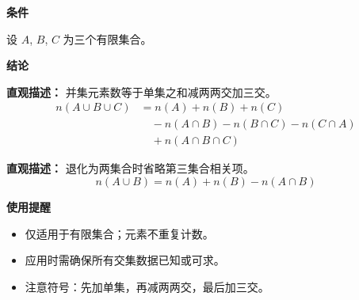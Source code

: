 \begin{statementbox}
	\textbf{\textcolor{CStatement}{条件}}
	\begin{description}[style=nextline, leftmargin=2.8em, labelsep=0.5em, itemsep=0.35em]
		\item[\textbf{\textcolor{CStatement}{条件 1（三有限集）：}}] 设 $A$, $B$, $C$ 为三个有限集合。
	\end{description}

	\textbf{\textcolor{CStatement}{结论}}
	\begin{description}[style=nextline, leftmargin=2.8em, labelsep=0.5em, itemsep=0.45em]
		\item[\textbf{\textcolor{CStatement}{结论一（并集计数）：}}]
			\textbf{\textcolor{CStatement}{直观描述：}}
			并集元素数等于单集之和减两两交加三交。
			\[
				\begin{aligned}
					n(A\cup B\cup C) &= n(A)+n(B)+n(C) \\
					&\quad -n(A\cap B)-n(B\cap C)-n(C\cap A) \\
					&\quad +n(A\cap B\cap C)
			\end{aligned}
			\]

		\item[\textbf{\textcolor{CStatement}{常见变形（两集合情形）：}}]
			\textbf{\textcolor{CStatement}{直观描述：}}
			退化为两集合时省略第三集合相关项。
			\[
				n(A\cup B)=n(A)+n(B)-n(A\cap B)
			\]
	\end{description}

	\textbf{\textcolor{CStatement}{使用提醒}}
	\begin{itemize}[leftmargin=*, itemsep=0.5em, topsep=0.4em]
		\item 仅适用于有限集合；元素不重复计数。
		\item 应用时需确保所有交集数据已知或可求。
		\item 注意符号：先加单集，再减两两交，最后加三交。
	\end{itemize}
\end{statementbox}
